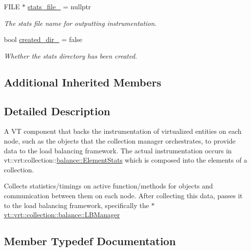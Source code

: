 \begin{DoxyCompactItemize}
F\+I\+LE $\ast$ \hyperlink{structvt_1_1vrt_1_1collection_1_1balance_1_1_proc_stats_a7c1a0cd0d083053cc4670873bc4f6ef1}{stats\+\_\+file\+\_\+} = nullptr
\begin{DoxyCompactList}\small\item\em The stats file name for outputting instrumentation. \end{DoxyCompactList}\item 
bool \hyperlink{structvt_1_1vrt_1_1collection_1_1balance_1_1_proc_stats_a44e4994b863721b1a20bcd2333a1966b}{created\+\_\+dir\+\_\+} = false
\begin{DoxyCompactList}\small\item\em Whether the stats directory has been created. \end{DoxyCompactList}\end{DoxyCompactItemize}
\subsection*{Additional Inherited Members}


\subsection{Detailed Description}
A VT component that backs the instrumentation of virtualized entities on each node, such as the objects that the collection manager orchestrates, to provide data to the load balancing framework. The actual instrumentation occurs in {\ttfamily vt\+::vrt\+:collection\+:}\+:\hyperlink{structvt_1_1vrt_1_1collection_1_1balance_1_1_element_stats}{balance\+::\+Element\+Stats} which is composed into the elements of a collection. 

Collects statistics/timings on active function/methods for objects and communication between them on each node. After collecting this data, passes it to the load balancing framework, specifically the {\ttfamily $\ast$} \hyperlink{structvt_1_1vrt_1_1collection_1_1balance_1_1_l_b_manager}{vt\+::vrt\+::collection\+::balance\+::\+L\+B\+Manager} 

\subsection{Member Typedef Documentation}
\mbox{\label{structvt_1_1vrt_1_1collection_1_1balance_1_1_proc_stats_a7cb065ac4de218cb717bc2634782f0cb}} 
